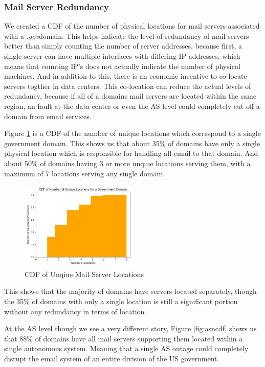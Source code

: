 \documentclass{hotnets21}
\newcommand{\dotgov}{\textit{.gov}\space}
\begin{document}
\subsubsection{Mail Server Redundancy}

We created a CDF of the number of physical locations for mail servers associated with a \dotgov domain.
This helps indicate the level of redundancy of mail servers better than simply counting the number of server addresses, because first, a single server can have multiple interfaces with differing IP addresses, which means that counting IP's does not actually indicate the number of physical machines.
And in addition to this, there is an economic incentive to co-locate servers togther in data centers.
This co-location can reduce the actual levels of redundancy, because if all of a domains mail servers are located within the same region, an fault at the data center or even the AS level could completely cut off a domain from email services.

Figure \ref{fig:locationcdf} is a CDF of the number of unique locations which correspond to a single government domain. This shows us that about 35\% of domains have only a single physical location which is responsible for handling all email to that domain.
And about 50\% of domains having 3 or more unqiue locations serving them, with a maximum of 7 locations serving any single domain.

\begin{figure}
\label{fig:locationcdf}
\noindent\includegraphics[width=0.5\textwidth]{Summary/Location Count CDF.png}
\caption{CDF of Unqiue Mail Server Locations}
\end{figure}

This shows that the majority of domains have servers located separately, though the 35\% of domains with only a single location is still a significant portion without any redundancy in terms of location.

At the AS level though we see a very different story, Figure \ref{fig:asncdf} shows us that 88\% of domains have all mail servers supporting them located within a single autonomous system.
Meaning that a single AS outage could completely disrupt the email system of an entire division of the US government.
\end{document}
